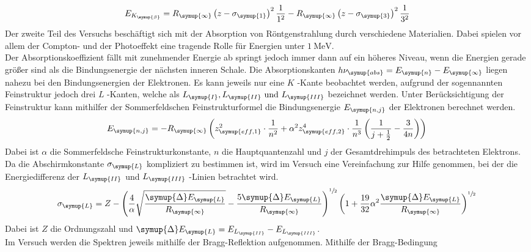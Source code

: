 \begin{align}
  E_{K_\symup{\beta}} = R_\symup{\infty} \left(z - \sigma_\symup{1} \right)^2\dfrac{1}{1^2} -
  R_\symup{\infty}\left(z - \sigma_\symup{3}\right)^2 \dfrac{1}{3^2}
  \label{eqn:E_K_b}
\end{align}
\newpage
Der zweite Teil des Versuchs beschäftigt sich mit der Absorption von Röntgenstrahlung durch
verschiedene Materialien. Dabei spielen vor allem der Compton- und der Photoeffekt eine
tragende Rolle für Energien unter $\SI{1}{\mega\electronvolt}$.\\
Der Absorptionskoeffizient fällt mit zunehmender Energie ab springt jedoch immer dann
auf ein höheres Niveau, wenn die Energien gerade größer sind als die Bindungsenergie der
nächsten inneren Schale. Die Absorptionskanten $h\nu_\symup{abs} = E_\symup{n} - E_\symup{\infty}$
liegen nahezu bei den Bindungsenergien der Elektronen. Es kann jeweils nur eine $K$ -Kante
beobachtet werden, aufgrund der sogennannten Feinstruktur jedoch drei $L$ -Kanten,
welche als $L_\symup{I},L_\symup{II} \text{ und } L_\symup{III}$
bezeichnet werden. Unter Berücksichtigung der Feinstruktur kann mithilfer der
Sommerfeldschen Feinstrukturformel die Bindungsenergie $E_\symup{n,j}$ der Elektronen
berechnet werden.
\begin{equation}
  E_\symup{n,j} = -R_\symup{\infty} \left(z_\symup{eff,1}^2 \cdot \dfrac{1}{n^2}
  + \alpha^2 z_\symup{eff,2}^4 \cdot \dfrac{1}{n^3}\left(\dfrac{1}{j+\frac{1}{2}}-
  \dfrac{3}{4n}\right)\right)
  \label{eqn:E_n,j}\\
\end{equation}
Dabei ist $\alpha$ die Sommerfeldsche Feinstrukturkonstante, $n$ die Hauptquantenzahl und
$j$ der Gesamtdrehimpuls des betrachteten Elektrons. Da die Abschirmkonstante $\sigma_\symup{L}$
kompliziert zu bestimmen ist, wird im Versuch eine Vereinfachung zur Hilfe genommen,
bei der die Energiedifferenz der $L_\symup{II}$ und $L_\symup{III}$ -Linien betrachtet wird.
\begin{equation}
  \sigma_\symup{L} = Z - \left(\dfrac{4}{\alpha}\sqrt{\dfrac{\symup{\Delta} E_\symup{L}}{R_\symup{\infty}}}
  - \dfrac{5 \symup{\Delta} E_\symup{L} }{R_\symup{\infty}} \right)^{\sfrac{1}{2}}
  \left(1 + \dfrac{19}{32} \alpha^2 \dfrac{\symup{\Delta} E_\symup{L}}{R_\symup{\infty}} \right)^{\sfrac{1}{2}}
  \label{eqn:sigma_L}\\
\end{equation}
Dabei ist $Z$ die Ordnungszahl und $\symup{\Delta} E_\symup{L} = E_{L_\symup{II}} -E_{L_\symup{III}}$.\\
Im Versuch werden die Spektren jeweils mithilfe der Bragg-Reflektion aufgenommen. Mithilfe
der Bragg-Bedingung

